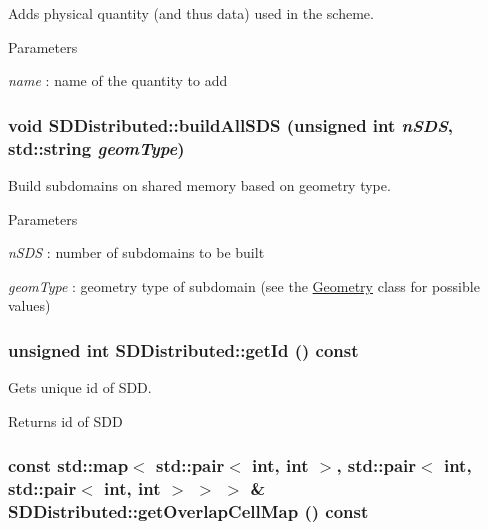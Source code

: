 Adds physical quantity (and thus data) used in the scheme. 
\begin{DoxyParams}{Parameters}
\item[{\em name}]: name of the quantity to add \end{DoxyParams}
\hypertarget{classSDDistributed_a3dbacea02c2d4f36310c81f87f90fe5a}{
\subsubsection[{buildAllSDS}]{\setlength{\rightskip}{0pt plus 5cm}void SDDistributed::buildAllSDS (unsigned int {\em nSDS}, \/  std::string {\em geomType})}}
\label{classSDDistributed_a3dbacea02c2d4f36310c81f87f90fe5a}


Build subdomains on shared memory based on geometry type. 
\begin{DoxyParams}{Parameters}
\item[{\em nSDS}]: number of subdomains to be built \item[{\em geomType}]: geometry type of subdomain (see the \hyperlink{classGeometry}{Geometry} class for possible values) \end{DoxyParams}
\hypertarget{classSDDistributed_ae8172d73b8eedd0fe13712ef898149a2}{
\subsubsection[{getId}]{\setlength{\rightskip}{0pt plus 5cm}unsigned int SDDistributed::getId () const}}
\label{classSDDistributed_ae8172d73b8eedd0fe13712ef898149a2}


Gets unique id of SDD. \begin{DoxyReturn}{Returns}
id of SDD 
\end{DoxyReturn}
\hypertarget{classSDDistributed_afe481d91ab9ba6ebde03e4e61a6cd053}{
\subsubsection[{getOverlapCellMap}]{\setlength{\rightskip}{0pt plus 5cm}const std::map$<$ std::pair$<$ int, int $>$, std::pair$<$ int, std::pair$<$ int, int $>$ $>$ $>$ \& SDDistributed::getOverlapCellMap () const}}
\label{classSDDistributed_afe481d91ab9ba6ebde03e4e61a6cd053}


